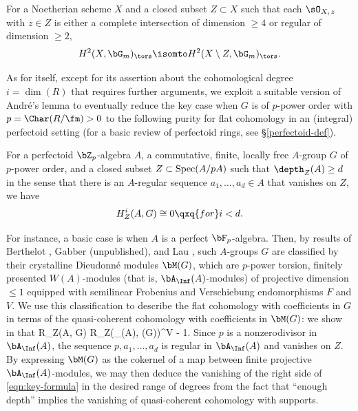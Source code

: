 For a Noetherian scheme $X$ and a closed subset $Z \subset X$ such that each $\sO_{X,\, z}$ with $z \in Z$ is either a complete intersection of dimension $\ge 4$ or regular of dimension $\ge 2$,
\[
H^2(X, \bG_m)_\tors \isomto H^2(X \setminus Z, \bG_m)_\tors.
\]
\ethm



As for  itself, except for its assertion about the cohomological degree $i = \dim(R)$ that requires further arguments, we exploit a suitable version of Andr\'{e}'s lemma to eventually reduce the key case when $G$ is of $p$-power order with $p = \Char(R/\fm) > 0$ to the following purity for flat cohomology in an (integral) perfectoid setting (for a basic review of perfectoid rings, see \S\ref{perfectoid-def}).

 \label{thm:perfectoid-purity-ann}
For a perfectoid $\bZ_p$-algebra $A$, a commutative, finite, locally free $A$-group $G$ of $p$-power order, and a closed subset $Z \subset \operatorname{Spec} (A/pA)$ such that $\depth_Z(A) \ge d$ in the sense that there is an $A$-regular sequence $a_1, \dotsc, a_d \in A$ that vanishes on $Z$, we have
\[
H^i_Z(A, G) \cong 0 \qxq{for} i < d.
\]
\ethm


For instance, a basic case is when $A$ is a perfect $\bF_p$-algebra. Then, by results of Berthelot \cite{Ber80}, Gabber (unpublished), and Lau \cite{Lau13}, such $A$-groups $G$ are classified by their crystalline Dieudonn\'{e} modules $\bM(G)$, which are $p$-power torsion, finitely presented $W(A)$-modules (that is, $\bA_\Inf(A)$-modules) of projective dimension $\le 1$ equipped with semilinear Frobenius and Verschiebung endomorphisms $F$ and $V$. We use this classification to describe the flat cohomology with coefficients in $G$ in terms of the quasi-coherent cohomology with coefficients in $\bM(G)$: we show in  that
\be{} \label{eqn:key-formula}
R\Gamma_Z(A, G) \cong R\Gamma_Z(\bA_\Inf(A), \bM(G))^{V - 1}.
\ee
Since $p$ is a nonzerodivisor in $\bA_\Inf(A)$, the sequence $p, a_1, \dotsc, a_d$ is regular in $\bA_\Inf(A)$ and vanishes on $Z$. By expressing $\bM(G)$ as the cokernel of a map between finite projective $\bA_\Inf(A)$-modules, we may then deduce the vanishing of the right side of \eqref{eqn:key-formula} in the desired range of degrees from the fact that ``enough depth'' implies the vanishing of quasi-coherent cohomology with supports.

